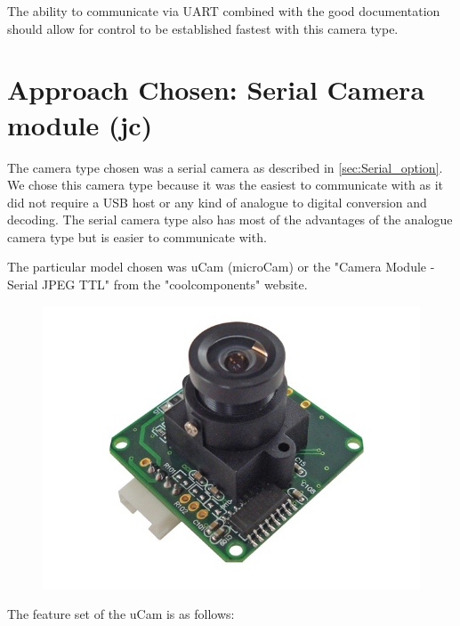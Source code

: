 The ability to communicate via UART combined with the good documentation should allow for control to be established fastest with this camera type.

\section{Approach Chosen: Serial Camera module (jc)}
\label{sec:John_chosen_options}

The camera type chosen was a serial camera as described in \ref{sec:Serial_option}. We chose this camera type because it was the easiest to communicate with as it did not require a USB host or any kind of analogue to digital conversion and decoding. The serial camera type also has most of the advantages of the analogue camera type but is easier to communicate with.

The particular model chosen was uCam (microCam) or the "Camera Module - Serial JPEG TTL" from the "coolcomponents" website.

\begin{figure}[H]
        \centering
        \includegraphics[width=1.00\textwidth]{figures/uCam.jpg}
        \label{fig:uCam_photo}
\end{figure}

The feature set of the uCam is as follows:

